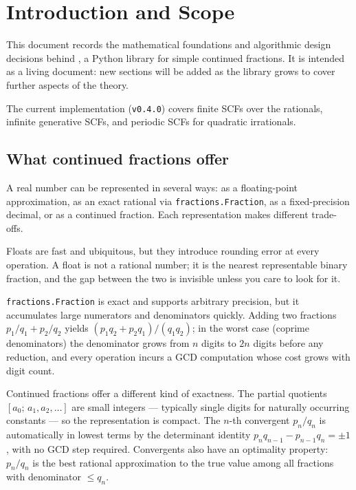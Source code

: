 \section{Introduction and Scope}

This document records the mathematical foundations and algorithmic design decisions
behind \catena, a Python library for simple continued fractions.
It is intended as a living document: new sections will be added as the library
grows to cover further aspects of the theory.

The current implementation (\texttt{v0.4.0}) covers finite SCFs over the rationals,
infinite generative SCFs, and periodic SCFs for quadratic irrationals.

\subsection{What continued fractions offer}

A real number can be represented in several ways: as a floating-point approximation,
as an exact rational via \texttt{fractions.Fraction}, as a fixed-precision decimal,
or as a continued fraction.  Each representation makes different trade-offs.

Floats are fast and ubiquitous, but they introduce rounding error at every operation.
A float is not a rational number; it is the nearest representable binary fraction,
and the gap between the two is invisible unless you care to look for it.

\texttt{fractions.Fraction} is exact and supports arbitrary precision, but it
accumulates large numerators and denominators quickly.  Adding two fractions
$p_1/q_1 + p_2/q_2$ yields $(p_1 q_2 + p_2 q_1)/(q_1 q_2)$; in the worst case
(coprime denominators) the denominator grows from $n$ digits to $2n$ digits before
any reduction, and every operation incurs a GCD computation whose cost grows with
digit count.

Continued fractions offer a different kind of exactness.  The partial quotients
$[a_0;\, a_1, a_2, \ldots]$ are small integers — typically single digits for
naturally occurring constants — so the representation is compact.  The $n$-th
convergent $p_n/q_n$ is automatically in lowest terms by the determinant identity
$p_n q_{n-1} - p_{n-1} q_n = \pm 1$, with no GCD step required.  Convergents
also have an optimality property: $p_n/q_n$ is the best rational approximation
to the true value among all fractions with denominator $\leq q_n$.

